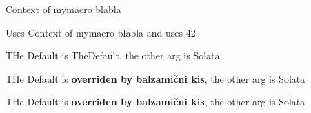 \documentclass[a4paper]{article}
\newcommand{\mymacro}{Context of mymacro blabla}
\newcommand{\withargs}[2]{Uses #1 and uses #2}
\newcommand{\withdefvalues}[2][TheDefault]{THe Default is #1, the other arg is #2}
\begin{document}
\mymacro{}

\withargs{\mymacro}{42}

\withdefvalues{Solata}

\withdefvalues[{\textbf{overriden by balzamični kis}}]{Solata}


\withdefvalues[{\textbf{overriden by balzamični kis}}]%
{Solata}
\end{document}
